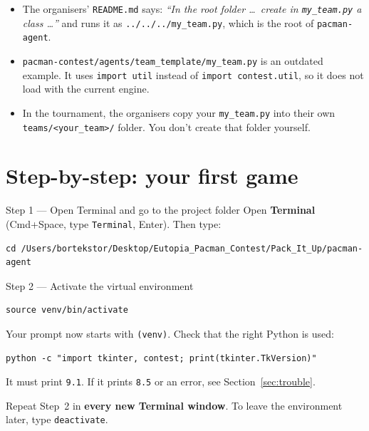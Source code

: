 \documentclass[11pt,a4paper]{article}
\newcommand{\p}[1]{\nolinkurl{#1}}  %
\begin{document}
\begin{careful}
\begin{itemize}
  \item The organisers' \texttt{README.md} says: \emph{``In the root folder \ldots\ create in \texttt{my\_team.py} a class \ldots''}
        and runs it as \p{../../../my_team.py}, which is the root of \texttt{pacman-agent}.
  \item \p{pacman-contest/agents/team_template/my_team.py} is an outdated example. It uses \texttt{import util}
        instead of \texttt{import contest.util}, so it does not load with the current engine.
  \item In the tournament, the organisers copy your \texttt{my\_team.py} into their own \p{teams/<your_team>/} folder.
        You don't create that folder yourself.
\end{itemize}
\end{careful}

\section{Step-by-step: your first game}

\begin{step}{Step 1 --- Open Terminal and go to the project folder}
Open \textbf{Terminal} (Cmd+Space, type \texttt{Terminal}, Enter). Then type:
\begin{lstlisting}
cd /Users/bortekstor/Desktop/Eutopia_Pacman_Contest/Pack_It_Up/pacman-agent
\end{lstlisting}
\end{step}

\begin{step}{Step 2 --- Activate the virtual environment}
\begin{lstlisting}
source venv/bin/activate
\end{lstlisting}
\begin{expect}
Your prompt now starts with \texttt{(venv)}. Check that the right Python is used:
\begin{lstlisting}
python -c "import tkinter, contest; print(tkinter.TkVersion)"
\end{lstlisting}
It must print \texttt{9.1}. If it prints \texttt{8.5} or an error, see Section~\ref{sec:trouble}.
\end{expect}
Repeat Step~2 in \textbf{every new Terminal window}. To leave the environment later, type \texttt{deactivate}.
\end{step}
\end{document}
